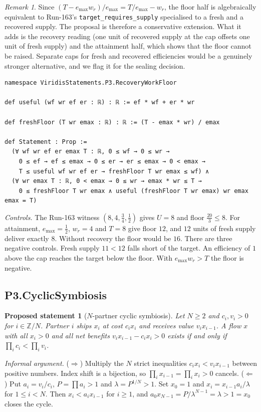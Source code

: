\documentclass[11pt]{article}
\newtheorem{proposal}{Proposed statement}
\theoremstyle{remark}
\newtheorem*{remark}{Remark}
\begin{document}
\begin{remark}
Since $(T-e_{\max}w_r)/e_{\max}=T/e_{\max}-w_r$, the floor half is algebraically equivalent to
Run-163's \texttt{target\_requires\_supply} specialised to a fresh and a recovered supply. The
proposal is therefore a conservative extension. What it adds is the recovery reading (one unit
of recovered supply at the cap offsets one unit of fresh supply) and the attainment half, which
shows that the floor cannot be raised. Separate caps for fresh and recovered efficiencies would
be a genuinely stronger alternative, and we flag it for the sealing decision.
\end{remark}

\begin{lstlisting}[caption={Core of \texttt{proposals/P3.RecoveryWorkFloor.lean}.}]
namespace ViridisStatements.P3.RecoveryWorkFloor

def useful (wf wr ef er : ℝ) : ℝ := ef * wf + er * wr

def freshFloor (T wr emax : ℝ) : ℝ := (T - emax * wr) / emax

def Statement : Prop :=
  (∀ wf wr ef er emax T : ℝ, 0 ≤ wf → 0 ≤ wr →
    0 ≤ ef → ef ≤ emax → 0 ≤ er → er ≤ emax → 0 < emax →
    T ≤ useful wf wr ef er → freshFloor T wr emax ≤ wf) ∧
  (∀ wr emax T : ℝ, 0 < emax → 0 ≤ wr → emax * wr ≤ T →
    0 ≤ freshFloor T wr emax ∧ useful (freshFloor T wr emax) wr emax emax = T)
\end{lstlisting}

\emph{Controls.} The Run-163 witness $(8,4,\tfrac34,\tfrac12)$ gives $U=8$ and floor
$\tfrac{20}{3}\le8$. For attainment, $e_{\max}=\tfrac12$, $w_r=4$ and $T=8$ give floor $12$, and
$12$ units of fresh supply deliver exactly $8$. Without recovery the floor would be $16$. There
are three negative controls. Fresh supply $11<12$ falls short of the target. An efficiency of $1$
above the cap reaches the target below the floor. With $e_{\max}w_r>T$ the floor is negative.

\subsection{P3.CyclicSymbiosis}
\begin{proposal}[$N$-partner cyclic symbiosis]
Let $N\ge2$ and $c_i,v_i>0$ for $i\in\mathbb{Z}/N$. Partner $i$ ships $x_i$ at cost $c_ix_i$ and
receives value $v_ix_{i-1}$. A flow $x$ with all $x_i>0$ and all net benefits
$v_ix_{i-1}-c_ix_i>0$ exists if and only if $\prod_i c_i<\prod_i v_i$.
\end{proposal}
\emph{Informal argument.} ($\Rightarrow$) Multiply the $N$ strict inequalities
$c_ix_i<v_ix_{i-1}$ between positive numbers. Index shift is a bijection, so
$\prod_i x_{i-1}=\prod_i x_i>0$ cancels. ($\Leftarrow$) Put $a_i=v_i/c_i$, $P=\prod a_i>1$ and
$\lambda=P^{1/N}>1$. Set $x_0=1$ and $x_i=x_{i-1}a_i/\lambda$ for $1\le i<N$. Then
$x_i<a_ix_{i-1}$ for $i\ge1$, and $a_0x_{N-1}=P/\lambda^{N-1}=\lambda>1=x_0$ closes the cycle.
\end{document}
